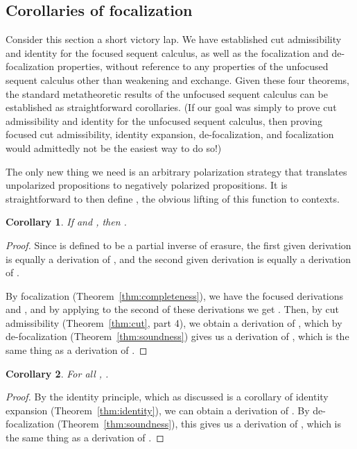 \documentclass[acmtocl]{robtrans}\pdfoutput=1
\newtheorem{corollary}{Corollary}
\begin{document}
\subsection{Corollaries of focalization}\label{ref:corollaries}

Consider this section a short victory lap. We have established cut
admissibility and identity for the focused sequent calculus, as well
as the focalization and de-focalization properties, without reference
to any properties of the unfocused sequent calculus other than
weakening and exchange. Given these four theorems, the standard
metatheoretic results of the unfocused sequent calculus can be
established as straightforward corollaries. (If our goal was simply to
prove cut admissibility and identity for the unfocused sequent
calculus, then proving focused cut admissibility, identity expansion,
de-focalization, and focalization would admittedly not be the easiest
way to do so!)

The only new thing we need is an arbitrary polarization strategy
 that translates unpolarized propositions to negatively
polarized propositions. It is straightforward to then define
, the obvious lifting of this function to
contexts.

\begin{corollary}\label{cor:cut}
If  and , then .
\end{corollary}

\begin{proof}
Since  is defined to be a partial inverse of erasure,
the first given derivation is equally a derivation of
, and
the second given derivation is equally a derivation of
. 

By focalization (Theorem~\ref{thm:completeness}), we have the focused
derivations  and
, and
by applying  to the second of these derivations we get
.
Then, by cut admissibility (Theorem~\ref{thm:cut}, part 4), we obtain
a derivation of , which by
de-focalization (Theorem~\ref{thm:soundness}) gives us a derivation of
, 
which is the same thing as a derivation of .
\end{proof}

\clearpage
\begin{corollary}\label{cor:identity}
For all , .
\end{corollary}

\begin{proof}
By the identity principle, which as discussed is a corollary of
identity expansion (Theorem~\ref{thm:identity}), we can obtain a
derivation of . By
de-focalization (Theorem~\ref{thm:soundness}), this gives us a
derivation of , which is the same thing
as a derivation of .
\end{proof}
\end{document}
